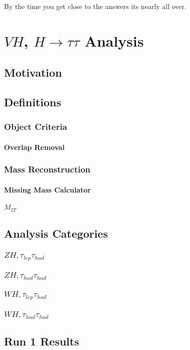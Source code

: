 \begin{savequote}[75mm]
By the time you get close to the answers its nearly all over.
\end{savequote}

\chapter{$VH$, $H\rightarrow \tau\tau$ Analysis}

\section{Motivation}

\section{Definitions}
\subsection{Object Criteria}
\subsubsection{Overlap Removal}
\subsection{Mass Reconstruction}
\subsubsection{Missing Mass Calculator}
\subsubsection{$M_{2T}$}

\section{Analysis Categories}
\subsection{$ZH, \tau_{lep}\tau_{had}$}
\subsection{$ZH, \tau_{had}\tau_{had}$}
\subsection{$WH, \tau_{lep}\tau_{had}$}
\subsection{$WH,\tau_{had}\tau_{had}$}

\section{Run 1 Results}
